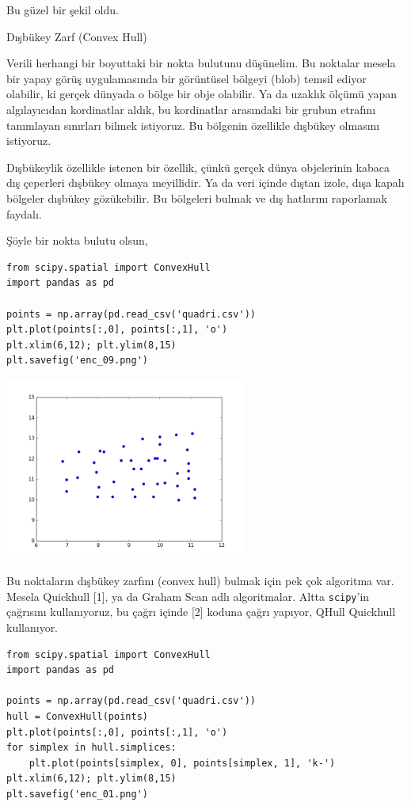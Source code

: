 \documentclass[12pt,fleqn]{article}\usepackage{../../common}
\begin{document}
Bu güzel bir şekil oldu.

Dışbükey Zarf (Convex Hull)

Verili herhangi bir boyuttaki bir nokta bulutunu düşünelim. Bu noktalar
mesela bir yapay görüş uygulamasında bir görüntüsel bölgeyi (blob) temsil
ediyor olabilir, ki gerçek dünyada o bölge bir obje olabilir. Ya da uzaklık
ölçümü yapan algılayıcıdan kordinatlar aldık, bu kordinatlar arasındaki bir
grubun etrafını tanımlayan sınırları bilmek istiyoruz. Bu bölgenin
özellikle dışbükey olmasını istiyoruz.

Dışbükeylik özellikle istenen bir özellik, çünkü gerçek dünya objelerinin
kabaca dış çeperleri dışbükey olmaya meyillidir. Ya da veri içinde dıştan
izole, dışa kapalı bölgeler dışbükey gözükebilir. Bu bölgeleri bulmak ve
dış hatlarını raporlamak faydalı.

Şöyle bir nokta bulutu olsun, 

\begin{verbatim}
from scipy.spatial import ConvexHull
import pandas as pd

points = np.array(pd.read_csv('quadri.csv'))
plt.plot(points[:,0], points[:,1], 'o')
plt.xlim(6,12); plt.ylim(8,15)
plt.savefig('enc_09.png')
\end{verbatim}

\includegraphics[height=6cm]{enc_09.png}

Bu noktaların dışbükey zarfını (convex hull) bulmak için pek çok algoritma
var. Mesela Quickhull [1], ya da Graham Scan adlı algoritmalar. Altta
\verb!scipy!'in çağrısını kullanıyoruz, bu çağrı içinde [2] koduna çağrı
yapıyor, QHull Quickhull kullanıyor.

\begin{verbatim}
from scipy.spatial import ConvexHull
import pandas as pd

points = np.array(pd.read_csv('quadri.csv'))
hull = ConvexHull(points)
plt.plot(points[:,0], points[:,1], 'o')
for simplex in hull.simplices:
    plt.plot(points[simplex, 0], points[simplex, 1], 'k-')
plt.xlim(6,12); plt.ylim(8,15)
plt.savefig('enc_01.png')
\end{verbatim}
\end{document}

